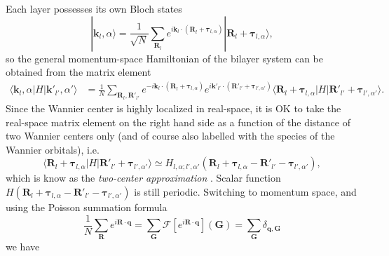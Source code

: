 Each layer possesses its own Bloch states
\begin{equation*}
    |\bm k_l,\alpha\rangle =\dfrac{1}{\sqrt N}\sum_{\bm R_l} e^{i\bm k_l\cdot(\bm R_l+\bm\tau_{l,\alpha})}|\bm R_l+\bm\tau_{l,\alpha}\rangle,
\end{equation*}
so the general momentum-space Hamiltonian of the bilayer system can be obtained from the matrix element
\begin{align*}
    \langle\bm k_l,\alpha|H|\bm k'_{l'},\alpha'\rangle & =\frac{1}{N}\sum_{\bm R_l,\bm R'_{l'}}e^{-i\bm k_l\cdot(\bm R_l+\bm\tau_{l,\alpha})}e^{i\bm k'_{l'}\cdot(\bm R'_{l'}+\bm\tau_{l',\alpha'})}\langle\bm R_l+\bm\tau_{l,\alpha}|H|\bm R'_{l'}+\bm\tau_{l',\alpha'}\rangle.
\end{align*}
Since the Wannier center is highly localized in real-space, it is OK to take the real-space matrix element on the right hand side as a function of the distance of two Wannier centers only (and of course also labelled with the species of the Wannier orbitals), i.e.
\begin{equation*}
    \langle\bm R_l+\bm\tau_{l,\alpha}|H|\bm R'_{l'}+\bm\tau_{l',\alpha'}\rangle\simeq H_{l,\alpha;l',\alpha'}(\bm R_l+\bm\tau_{l,\alpha}-\bm R'_{l'}-\bm\tau_{l',\alpha'}),
\end{equation*}
which is know as the \emph{two-center approximation} \cite{bistritzer2011moire}. Scalar function $H(\bm R_l+\bm\tau_{l,\alpha}-\bm R'_{l'}-\bm\tau_{l',\alpha'})$ is still periodic. Switching to momentum space, and using the Poisson summation formula
\begin{equation*}
    \frac{1}{N}\sum_{\bm R}e^{i\bm R\cdot\bm q}=\sum_{\bm G}\mathcal F[e^{i\bm R\cdot\bm q}](\bm G)=\sum_{\bm G}\delta_{\bm q,\bm G}
\end{equation*}
we have
